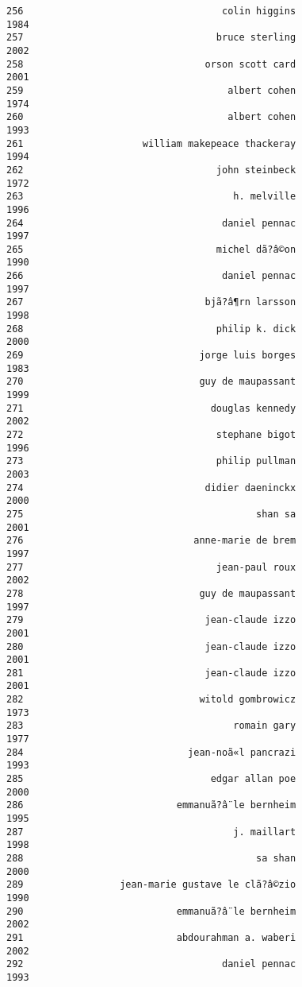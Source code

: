 \documentclass[
]{report}
\begin{document}
\begin{verbatim}
256                                   colin higgins                1984
257                                  bruce sterling                2002
258                                orson scott card                2001
259                                    albert cohen                1974
260                                    albert cohen                1993
261                     william makepeace thackeray                1994
262                                  john steinbeck                1972
263                                     h. melville                1996
264                                   daniel pennac                1997
265                                  michel dã?â©on                1990
266                                   daniel pennac                1997
267                                bjã?â¶rn larsson                1998
268                                  philip k. dick                2000
269                               jorge luis borges                1983
270                               guy de maupassant                1999
271                                 douglas kennedy                2002
272                                  stephane bigot                1996
273                                  philip pullman                2003
274                                didier daeninckx                2000
275                                         shan sa                2001
276                              anne-marie de brem                1997
277                                  jean-paul roux                2002
278                               guy de maupassant                1997
279                                jean-claude izzo                2001
280                                jean-claude izzo                2001
281                                jean-claude izzo                2001
282                               witold gombrowicz                1973
283                                     romain gary                1977
284                             jean-noã«l pancrazi                1993
285                                 edgar allan poe                2000
286                           emmanuã?â¨le bernheim                1995
287                                     j. maillart                1998
288                                         sa shan                2000
289                 jean-marie gustave le clã?â©zio                1990
290                           emmanuã?â¨le bernheim                2002
291                           abdourahman a. waberi                2002
292                                   daniel pennac                1993

\end{verbatim}
\end{document}
